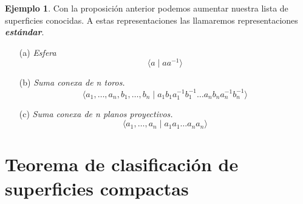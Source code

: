\documentclass[10pt]{report}
\newcommand{\enfatiza}[1]{\textbf{\textit{#1}}}
\theoremstyle{definition}
\newtheorem{eje}[defin]{Ejemplo}
\begin{document}
\begin{eje}
Con la proposición anterior podemos aumentar nuestra lista de superficies conocidas. A estas representaciones las llamaremos representaciones \enfatiza{estándar}.
\begin{itemize}
\item [(a)] \textit{Esfera} 
$$\langle a \mid aa^{-1} \rangle$$
\item[(b)] \textit{Suma conexa de n toros.}
$$\langle a_1,\dots ,a_n, b_1,\dots ,b_n\mid a_1b_1a_1^{-1}b_1^{-1}\dots a_nb_na_n^{-1}b_n^{-1}\rangle$$ 
\item[(c)] \textit{Suma conexa de n planos proyectivos.} 
$$\langle a_1,\dots ,a_n\mid a_1a_1\dots a_na_n\rangle$$
\end{itemize}
\end{eje}


\clearpage

\section{Teorema de clasificación de superficies compactas}
\end{document}
